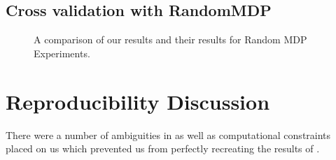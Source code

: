 \documentclass[11pt]{article} %
\begin{document}
\subsection{Cross validation with RandomMDP}

\begin{figure}
\centering
{}
\hspace{4mm}
\caption{A comparison of our results and their results for Random MDP Experiments.}
\end{figure}

\section{Reproducibility Discussion}
\label{sec: repDisc}

There were a number of ambiguities in \cite{jiang2015dependence} as well as computational constraints placed on us which prevented us from perfectly recreating the results of \cite{jiang2015dependence}. 
\end{document}
